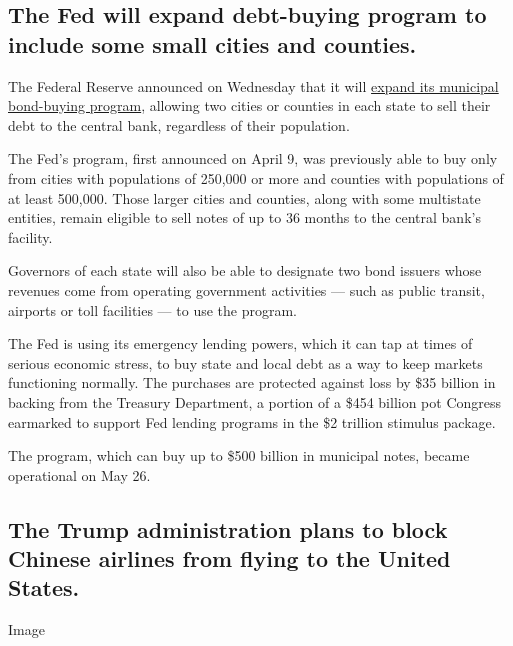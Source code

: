 \hypertarget{the-fed-will-expand-debt-buying-program-to-include-some-small-cities-and-counties}{%
\subsection{The Fed will expand debt-buying program to include some
small cities and
counties.}\label{the-fed-will-expand-debt-buying-program-to-include-some-small-cities-and-counties}}

The Federal Reserve announced on Wednesday that it will
\href{https://www.nytimes3xbfgragh.onion/2020/04/20/business/economy/fed-local-governments-coronavirus.html'}{expand
its municipal bond-buying program}, allowing two cities or counties in
each state to sell their debt to the central bank, regardless of their
population.

The Fed's program, first announced on April 9, was previously able to
buy only from cities with populations of 250,000 or more and counties
with populations of at least 500,000. Those larger cities and counties,
along with some multistate entities, remain eligible to sell notes of up
to 36 months to the central bank's facility.

Governors of each state will also be able to designate two bond issuers
whose revenues come from operating government activities --- such as
public transit, airports or toll facilities --- to use the program.

The Fed is using its emergency lending powers, which it can tap at times
of serious economic stress, to buy state and local debt as a way to keep
markets functioning normally. The purchases are protected against loss
by \$35 billion in backing from the Treasury Department, a portion of a
\$454 billion pot Congress earmarked to support Fed lending programs in
the \$2 trillion stimulus package.

The program, which can buy up to \$500 billion in municipal notes,
became operational on May 26.

\hypertarget{the-trump-administration-plans-to-block-chinese-airlines-from-flying-to-the-united-states}{%
\subsection{The Trump administration plans to block Chinese airlines
from flying to the United
States.}\label{the-trump-administration-plans-to-block-chinese-airlines-from-flying-to-the-united-states}}

Image

